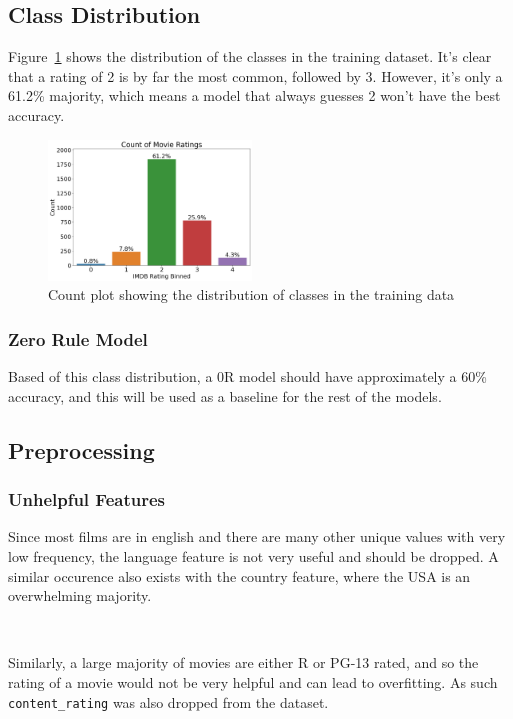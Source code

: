 
\subsection{Class Distribution}
Figure~\ref{fig:class-dist} shows the distribution of the classes in the training dataset. It's clear that a rating of 2 is by far the most common, followed by 3. However, it's only a 61.2\% majority, which means a model that always guesses 2 won't have the best accuracy.

\begin{figure}[!ht]
    \centering
    \includegraphics[width = 0.48\textwidth]{res/class-dist.png}
    \caption{Count plot showing the distribution of classes in the training data}
    \label{fig:class-dist}
\end{figure}

\subsubsection{Zero Rule Model}
Based of this class distribution, a 0R model should have approximately a 60\% accuracy, and this will be used as a baseline for the rest of the models.

\subsection{Preprocessing}

\subsubsection{Unhelpful Features}
Since most films are in english and there are many other unique values with very low frequency, the language feature is not very useful and should be dropped. A similar occurence also exists with the country feature, where the USA is an overwhelming majority. 

\ 

\noindent
Similarly, a large majority of movies are either R or PG-13 rated, and so the rating of a movie would not be very helpful and can lead to overfitting. As such \texttt{content\_rating} was also dropped from the dataset.

